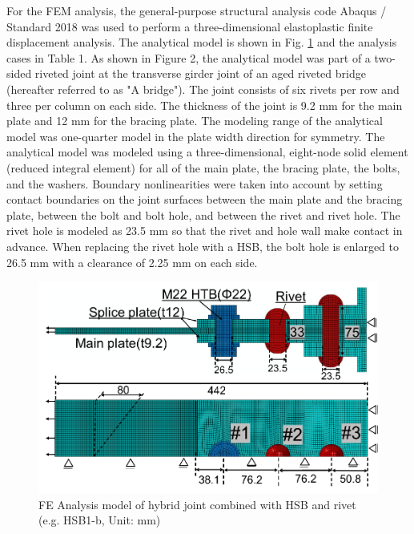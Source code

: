 For the FEM analysis, the general-purpose structural analysis code Abaqus / Standard 2018 \cite{Smith2020} was used to perform a three-dimensional elastoplastic finite displacement analysis. The analytical model is shown in Fig. \ref{fig-femodel-hsbrive} and the analysis cases in Table 1. As shown in Figure 2, the analytical model was part of a two-sided riveted joint at the transverse girder joint of an aged riveted bridge (hereafter referred to as "A bridge"). The joint consists of six rivets per row and three per column on each side. The thickness of the joint is 9.2 mm for the main plate and 12 mm for the bracing plate. The modeling range of the analytical model was one-quarter model in the plate width direction for symmetry. The analytical model was modeled using a three-dimensional, eight-node solid element (reduced integral element) for all of the main plate, the bracing plate, the bolts, and the washers. Boundary nonlinearities were taken into account by setting contact boundaries on the joint surfaces between the main plate and the bracing plate, between the bolt and bolt hole, and between the rivet and rivet hole. The rivet hole is modeled as 23.5 mm so that the rivet and hole wall make contact in advance. When replacing the rivet hole with a \ac{HSB}, the bolt hole is enlarged to 26.5 mm with a clearance of 2.25 mm on each side.

\begin{figure}[htbp]
    \centering
    \includegraphics[width=0.75\linewidth]{imgs//ch4/femodel-hsbrive.pdf}
    \caption{FE Analysis model of hybrid joint combined with HSB and rivet (e.g. HSB1-b, Unit: mm)}
    \label{fig-femodel-hsbrive}
\end{figure}


